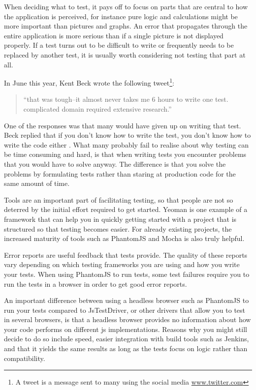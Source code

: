 \documentclass[11pt]{article}
\begin{document}
When deciding what to test, it pays off to focus on parts that are central to how the application is perceived, for instance pure logic and calculations might be more important than pictures and graphs. An error that propagates through the entire application is more serious than if a single picture is not displayed properly. If a test turns out to be difficult to write or frequently needs to be replaced by another test, it is usually worth considering not testing that part at all. \cite[questions~9-10]{Edelstam}

In June this year, Kent Beck wrote the following tweet\footnote{A tweet is a message sent to many using the social media \url{www.twitter.com}}:

\begin{quote}
``that was tough--it almost never takes me 6 hours to write one test. complicated domain required extensive research.''
\end{quote}

One of the responses was that many would have given up on writing that test. Beck replied that if you don't know how to write the test, you don't know how to write the code either \cite{TwitterKentBeck}. What many probably fail to realise about why testing can be time consuming and hard, is that when writing tests you encounter problems that you would have to solve anyway. The difference is that you solve the problems by formulating tests rather than staring at production code for the same amount of time. \cite[question~11]{Edelstam}

Tools are an important part of facilitating testing, so that people are not so deterred by the initial effort required to get started. Yeoman is one example of a framework that can help you in quickly getting started with a project that is structured so that testing becomes easier. For already existing projects, the increased maturity of tools such as PhantomJS and Mocha is also truly helpful. \cite[questions~11-12 and 20]{Edelstam}

Error reports are useful feedback that tests provide. The quality of these reports vary depending on which testing frameworks you are using and how you write your tests. When using PhantomJS to run tests, some test failures require you to run the tests in a browser in order to get good error reports. \cite[question~12]{Edelstam}

An important difference between using a headless browser such as PhantomJS to run your tests compared to JsTestDriver, or other drivers that allow you to test in several browsers, is that a headless browser provides no information about how your code performs on different \gls{js} implementations. Reasons why you might still decide to do so include speed, easier integration with build tools such as Jenkins, and that it yields the same results as long as the tests focus on logic rather than compatibility. \cite[questions~13-15]{Edelstam}
\end{document}
